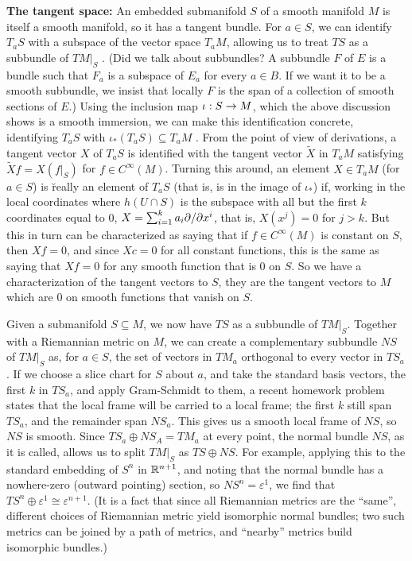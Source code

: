 \msk

{\bf The tangent space:} An embedded submanifold $S$ of a smooth manifold $M$ is itself a smooth manifold, so it has a
tangent bundle. For $a\in S$, we can identify $T_aS$ with a subspace of the vector space $T_aM$,
allowing us to treat $TS$ as a subbundle of $TM|_S$ . (Did we talk about subbundles?
A subbundle $F$ of $E$ is a bundle such that $F_a$ is a subspace of $E_a$ for 
every $a\in B$. If we want it to be a smooth subbundle, we insist that locally $F$ is the
span of a collection of smooth sections of $E$.) Using the inclusion map $\iota:S\rightarrow M$,
which the above discussion shows is a smooth immersion, we can make this identification
concrete, identifying $T_aS$ with $\iota_*(T_aS)\subseteq T_aM$ . From the point of 
view of derivations, a tangent vector $X$ of $T_aS$ is identified with the
tangent vector $\widetilde{X}$ in $T_aM$ satisfying $\widetilde{X}f=X(f|_S)$
for $f\in C^\infty(M)$. Turning this around, an element $X\in T_aM$ (for $a\in S$) is
\u{really} an element of $T_aS$ (that is, is in the image of $\iota_*$) if, working 
in the local coordinates where $h(U\cap S)$ is the subspace with all but the first
$k$ coordinates equal to $0$, $X=\sum_{i=1}^k a_i\partial/\partial x^i$, that is, 
$X(x^j)=0$ for $j>k$. But this in turn can be characterized as saying that if $f\in C^\infty(M)$
is constant on $S$, then $Xf=0$, and since $Xc=0$ for all constant functions, 
this is the same as saying that $Xf=0$ for any smooth function that is $0$ on $S$.
So we have a characterization of the tangent vectors to $S$, they are the tangent
vectors to $M$ which are $0$ on smooth functions that vanish on $S$.

\msk

Given a submanifold $S\subseteq M$, we now have $TS$ as a subbundle of $TM|_S$. Together
with a Riemannian metric on $M$, we can create a complementary subbundle $NS$ of 
$TM|_S$ as, for $a\in S$, the set of vectors in $TM_a$ orthogonal to every vector in $TS_a$.
If we choose a slice chart for $S$ about $a$, and take the standard basis vectors,
the first $k$ in $TS_a$, and apply Gram-Schmidt to them, a recent homework problem 
states that the local frame will be carried to a local frame; the first $k$ still span
$TS_a$, and the remainder span $NS_a$. This gives us a smooth local frame of $NS$,
so $NS$ is smooth. Since $TS_a\oplus NS_A=TM_a$ at every point, the normal
bundle $NS$, as it is called, allows us to split $TM|_S$ as
$TS\oplus NS$. For example, applying this to the standard embedding of 
$S^n$ in ${\Bbb R}^{n+1}$, and noting that the normal bundle has a nowhere-zero
(outward pointing) section, so $NS^n=\varepsilon^1$, we find that
$TS^n\oplus\varepsilon^1\cong \varepsilon^{n+1}$.
(It is a fact that since all Riemannian metrics are the ``same'', different choices of 
Riemannian metric yield isomorphic normal bundles; two such metrics can be joined by
a path of metrics, and ``nearby'' metrics build isomorphic bundles.)

